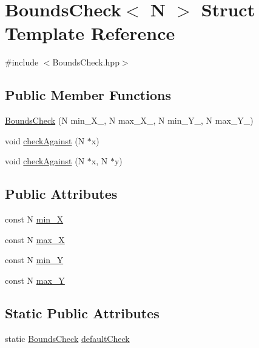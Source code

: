 \hypertarget{struct_bounds_check}{\section{Bounds\-Check$<$ N $>$ Struct Template Reference}
\label{struct_bounds_check}
}


{\ttfamily \#include $<$Bounds\-Check.\-hpp$>$}

\subsection*{Public Member Functions}
\begin{DoxyCompactItemize}
\item 
\hyperlink{struct_bounds_check_a96b37a668190f8a77a839bf2db8d2018}{Bounds\-Check} (N min\-\_\-\-X\-\_\-, N max\-\_\-\-X\-\_\-, N min\-\_\-\-Y\-\_\-, N max\-\_\-\-Y\-\_\-)
\item 
void \hyperlink{struct_bounds_check_a658e5f4df28ce555de929f2098728289}{check\-Against} (N $\ast$x)
\item 
void \hyperlink{struct_bounds_check_af1535e1d5737008bc2fcccf295da21c8}{check\-Against} (N $\ast$x, N $\ast$y)
\end{DoxyCompactItemize}
\subsection*{Public Attributes}
\begin{DoxyCompactItemize}
\item 
const N \hyperlink{struct_bounds_check_a7ddafd0ac07f6ddfbd357f8bd440e952}{min\-\_\-\-X}
\item 
const N \hyperlink{struct_bounds_check_a8ed31dd874e9ee585a08018225adae4a}{max\-\_\-\-X}
\item 
const N \hyperlink{struct_bounds_check_ab70f0f1fe16a50a94c7e937ce892ef38}{min\-\_\-\-Y}
\item 
const N \hyperlink{struct_bounds_check_a569066d0fc5179aefddf172605682e72}{max\-\_\-\-Y}
\end{DoxyCompactItemize}
\subsection*{Static Public Attributes}
\begin{DoxyCompactItemize}
\item 
static \hyperlink{struct_bounds_check}{Bounds\-Check} \hyperlink{struct_bounds_check_abab10f32ac9cf636626694c004a0dcc7}{default\-Check}
\end{DoxyCompactItemize}


